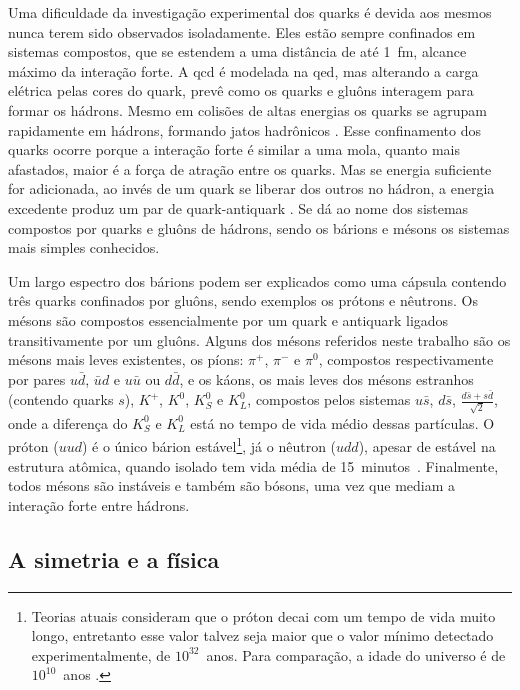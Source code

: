Uma dificuldade da investigação experimental dos quarks é devida aos mesmos
nunca terem sido observados isoladamente. Eles estão sempre confinados em sistemas
compostos, que se estendem a uma distância de até 1~fm, alcance máximo da interação forte. 
A \gls{qcd} é modelada na \gls{qed}, mas alterando a carga elétrica pelas cores do quark, 
prevê como os quarks e gluôns interagem para formar os hádrons. Mesmo
em colisões de altas energias os quarks se agrupam rapidamente em hádrons,
formando jatos hadrônicos \cite{Intro_Nuclear}. Esse confinamento dos quarks ocorre 
porque a interação forte é similar a uma mola, quanto mais afastados, maior é a
força de atração entre os quarks. Mas se energia suficiente for adicionada,
ao invés de um quark se liberar dos outros no hádron, a energia excedente produz
um par de quark-antiquark \cite{Beiser}.
Se dá ao nome dos sistemas compostos por quarks e gluôns de
hádrons, sendo os bárions e mésons os sistemas mais simples conhecidos. 

Um largo espectro dos bárions podem ser explicados como uma cápsula contendo
três quarks confinados por gluôns, sendo exemplos os prótons e nêutrons. Os mésons
são compostos essencialmente por um quark e antiquark ligados
transitivamente por um gluôns. Alguns dos mésons referidos neste trabalho são
os mésons mais leves existentes, os píons: $\pi^{+}$,
$\pi^{-}$ e $\pi^{0}$, compostos respectivamente por pares $u\bar{d}$, $\bar{u}d$ e
$u\bar{u}$ ou $d\bar{d}$, e os káons, os mais leves dos mésons estranhos
(contendo quarks $s$), $K^{+}$, $K^{0}$, $K^{0}_{S}$ e $K^{0}_{L}$, 
compostos pelos sistemas $u\bar{s}$, $d\bar{s}$,
$\frac{d\bar{s}+s\bar{d}}{\sqrt{2}}$, onde a diferença do $K^{0}_{S}$ e
$K^{0}_{L}$ está no tempo de vida médio dessas partículas. 
O próton ($uud$) é o único bárion estável\footnote{Teorias atuais consideram que
o próton decai com um tempo de vida muito longo, entretanto esse valor talvez seja maior 
que o valor mínimo detectado experimentalmente, de $10^{32}$~anos. 
Para comparação, a idade do universo é de $10^{10}$~anos \cite{Beiser}.}, 
já o nêutron ($udd$), apesar de estável na estrutura atômica,
quando isolado tem vida média de 15~minutos~\cite{Intro_Standard}. Finalmente, 
todos mésons são instáveis e também são bósons, uma vez que mediam a interação
forte entre hádrons.

\subsection{A simetria e a física}
\label{ssec:simetria}

